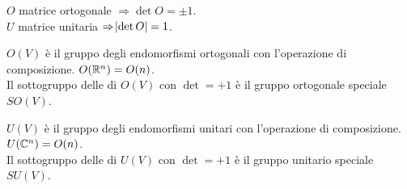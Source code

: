 \begin{prop}
	\textsf{$ O $ matrice ortogonale $ \Rightarrow \det O = \pm 1 $.\\
		$ U $ matrice unitaria $ \Rightarrow \abs{\det O} = 1 $.}
\end{prop}

\begin{definition}
	\textsf{$ O(V) $ è il gruppo degli endomorfismi ortogonali con l'operazione di composizione. $ O(\mathbb{R}^n) = O(n) $.\\
		Il sottogruppo delle di $ O(V) $ con $ \det = +1 $ è il gruppo ortogonale speciale $ SO(V) $. }
\end{definition}

\begin{definition}
	\textsf{$ U(V) $ è il gruppo degli endomorfismi unitari con l'operazione di composizione. $ U(\mathbb{C}^n) = O(n) $.\\
		Il sottogruppo delle di $ U(V) $ con $ \det = +1 $ è il gruppo unitario speciale $ SU(V) $. }
\end{definition}